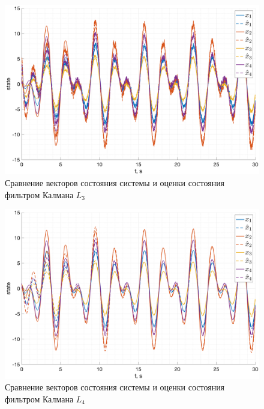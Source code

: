 \begin{figure}[ht!]
    \centering
    \includegraphics[width=\textwidth]{media/plots/kalman_task2/state_cmp_3.png}
    \caption{Сравнение векторов состояния системы и оценки состояния фильтром Калмана $L_3$}
    \label{fig:kalman3_x}
\end{figure}
\begin{figure}[ht!]
    \centering
    \includegraphics[width=\textwidth]{media/plots/kalman_task2/state_cmp_4.png}
    \caption{Сравнение векторов состояния системы и оценки состояния фильтром Калмана $L_4$}
    \label{fig:kalman4_x}
\end{figure}

